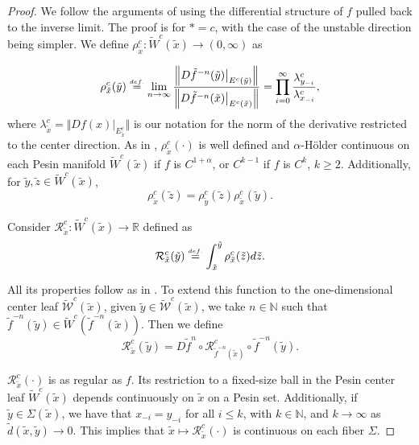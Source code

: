 \documentclass[a4paper,11pt,reqno]{amsart}
\def\tW{\widetilde W}
\newcommand\restr[2]{{ %
  \left.\kern-\nulldelimiterspace 
  #1 
  \vphantom{\big|} 
  \right|_{#2} 
  }}
\newcommand{\cW}{{\mathcal W}}
\newcommand{\eqdef}{\stackrel{\scriptscriptstyle\textrm def.}{=}}
\newcommand{\tix}{\tilde{x}}
\newcommand{\tif}{\tilde{f}}
\newcommand{\w}{\widetilde{\cW}}
\theoremstyle{definition}
\begin{document}
\begin{proof}
We follow the arguments of \cite{KalininKatok} using the differential structure of $f$ pulled back to the inverse limit. The proof is for ${*} = c$, with the case of the unstable direction being simpler. We define $\rho^c_{\tilde{x}}: \tW^c(\tix) \to (0, \infty)$ as

\begin{equation}
	\label{eq:rho}
	\rho^c_{\tilde{x}}(\tilde{y}) \eqdef \lim_{n \to \infty} \dfrac{\left\Vert \restr{D\tilde{f}^{-n}(\tilde{y})}{E^c(\tilde{y})}\right\Vert}{\left\Vert \restr{D\tilde{f}^{-n}(\tilde{x})}{E^c(\tilde{x})}\right\Vert} = \prod_{i=0}^\infty \dfrac{\lambda^c_{y_{-i}}}{\lambda^c_{x_{-i}}},
\end{equation}
where $\lambda^c_{\tilde{x}} = \Vert Df(x)|_{E^c_{\tilde{x}}} \Vert$ is our notation for the norm of the derivative restricted to the center direction. As in \cite{KalininKatok}, $\rho^c_{\tilde{x}}(\cdot)$ is well defined and $\alpha$-H\"older continuous on each Pesin manifold $\tW^c(\tix)$ if $f$ is $C^{1+\alpha}$, or $C^{k-1}$ if $f$ is $C^k$, $k \geq 2$. Additionally, for $\tilde{y}, \tilde{z} \in \tW^c(\tix)$,
\begin{equation}
    \label{eq:1cancela}
    \rho^c_{\tilde{x}}(\tilde{z}) = \rho^c_{\tilde{y}}(\tilde{z}) \rho^c_{\tilde{x}}(\tilde{y}).
\end{equation}

Consider $\mathcal{R}^c_{\tilde{x}}: \tW^c(\tix) \to \mathbb{R}$ defined as
\begin{equation}
	\label{eq:R}
	\mathcal{R}^c_{\tilde{x}}(\tilde{y}) \eqdef \int_{\tix}^{\tilde{y}} \rho^c_{\tilde{x}}(\tilde{z}) d\tilde{z}.
\end{equation}

All its properties follow as in \cite{KalininKatok}. To extend this function to the one-dimensional center leaf $\w^c(\tix)$, given $\tilde{y} \in \w^c(\tix)$, we take $n \in \mathbb{N}$ such that $\tif^{-n}(\tilde{y}) \in \tW^c(\tif^{-n}(\tix))$. Then we define
$$\mathcal{R}^c_{\tilde{x}}(\tilde{y}) = D\tilde{f}^n \circ \mathcal{R}^c_{\tilde{f}^{-n}(\tix)} \circ \tilde{f}^{-n}(\tilde{y}).$$

$\mathcal{R}^c_{\tilde{x}}(\cdot)$ is as regular as $f$. Its restriction to a fixed-size ball in the Pesin center leaf $\tW^c(\tix)$ depends continuously on $\tix$ on a Pesin set. Additionally, if $\tilde{y} \in \Sigma(\tilde{x})$, we have that $x_{-i} = y_{-i}$ for all $i \leq k$, with $k \in \mathbb{N}$, and $k \to \infty$ as $\tilde{d}(\tix, \tilde{y}) \to 0$. This implies that $\tilde{x} \mapsto \mathcal{R}^c_{\tilde{x}}(\cdot)$ is continuous on each fiber $\Sigma$.
\end{proof}
\end{document}
